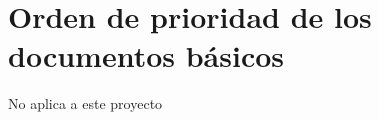 \documentclass[10pt,a4paper,oldfontcommands]{plantillaDSIC}
\begin{document}
\pagecolor{fondo}
\color{principal}


\tableofcontents

\clearpage


















\chapter{Orden de prioridad de los documentos básicos}
\par No aplica a este proyecto

\appendix






\listoffigures
\listoftables
\nocite{WEB:Metrica3}
\nocite{IMPRO:IEEE830}
\nocite{ART:CraigLarman}
\nocite{WEB:CONTRACT}


\end{document}
